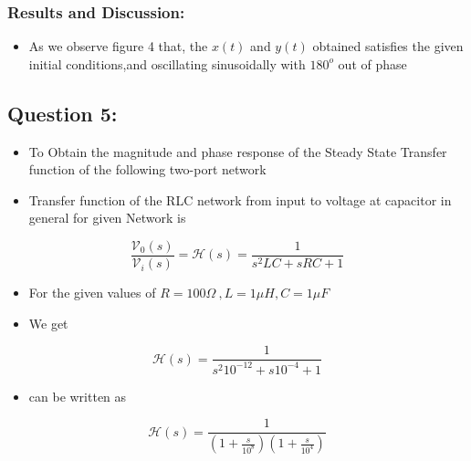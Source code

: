 \documentclass[11pt, a4paper]{article}
\begin{document}
\subsubsection{Results and Discussion:}\label{results-and-discussion}

\begin{itemize}

\item
  As we observe figure 4 that, the \(x(t)\) and \(y(t)\) obtained
  satisfies the given initial conditions,and oscillating sinusoidally
  with \(180^{o}\) out of phase
\end{itemize}
\newpage
    \subsection{Question 5:}\label{question-5}

\begin{itemize}
\item
  To Obtain the magnitude and phase response of the Steady State
  Transfer function of the following two-port network
\item
  Transfer function of the RLC network from input to voltage at
  capacitor in general for given Network is
\end{itemize}

\begin{equation}
    \frac{\mathcal{V} _{0}(s)}{\mathcal{V}_{i}(s)} = \mathcal{H}(s) = \frac{1}{s^{2}LC + sRC + 1}
\end{equation}

\begin{itemize}
\item
  For the given values of $ R = 100 \Omega\ , L = 1\mu H,C= 1\mu F$
\item
  We get
\end{itemize}

\begin{equation}
    \mathcal{H}(s) = \frac{1}{s^{2}10^{-12} + s10^{-4} + 1}
\end{equation}

\begin{itemize}

\item
  can be written as
\end{itemize}

\begin{equation}
    \mathcal{H}(s) = \frac{1}{(1 + \frac{s}{10^{8}})(1 + \frac{s}{10^{4}})}
\end{equation}
\end{document}
